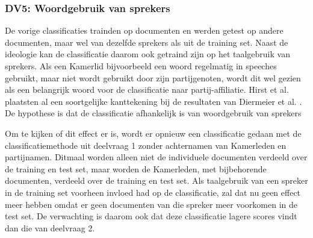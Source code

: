 \subsubsection{DV5: Woordgebruik van sprekers}
De vorige classificaties trainden op documenten en werden getest op andere documenten, maar wel van dezelfde sprekers als uit de training set. Naast de ideologie kan de classificatie daarom ook getraind zijn op het taalgebruik van sprekers. Als een Kamerlid bijvoorbeeld een woord regelmatig in speeches gebruikt, maar niet wordt gebruikt door zijn partijgenoten, wordt dit wel gezien als een belangrijk woord voor de classificatie naar partij-affiliatie. Hirst et al. \cite{Hirst_textto} plaatsten al een soortgelijke kanttekening bij de resultaten van Diermeier et al. \cite{diermeier_godbout_yu_kaufmann_2012}. De hypothese is dat de classificatie afhankelijk is van woordgebruik van sprekers\par
Om te kijken of dit effect er is, wordt er opnieuw een classificatie gedaan met de classificatiemethode uit deelvraag 1 zonder achternamen van Kamerleden en partijnamen. Ditmaal worden alleen niet de individuele documenten verdeeld over de training en test set, maar worden de Kamerleden, met bijbehorende documenten, verdeeld over de training en test set. Als taalgebruik van een spreker in de training set voorheen invloed had op de classificatie, zal dat nu geen effect meer hebben omdat er geen documenten van die spreker meer voorkomen in de test set. De verwachting is daarom ook dat deze classificatie lagere scores vindt dan die van deelvraag 2.\par


